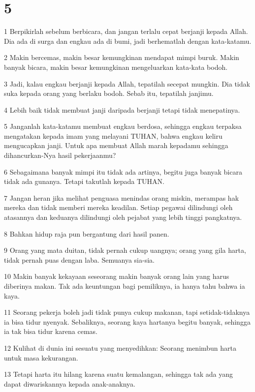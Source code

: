 \chapter{5}

\par 1 Berpikirlah sebelum berbicara, dan jangan terlalu cepat berjanji kepada Allah. Dia ada di surga dan engkau ada di bumi, jadi berhematlah dengan kata-katamu.
\par 2 Makin bercemas, makin besar kemungkinan mendapat mimpi buruk. Makin banyak bicara, makin besar kemungkinan mengeluarkan kata-kata bodoh.
\par 3 Jadi, kalau engkau berjanji kepada Allah, tepatilah secepat mungkin. Dia tidak suka kepada orang yang berlaku bodoh. Sebab itu, tepatilah janjimu.
\par 4 Lebih baik tidak membuat janji daripada berjanji tetapi tidak menepatinya.
\par 5 Janganlah kata-katamu membuat engkau berdosa, sehingga engkau terpaksa mengatakan kepada imam yang melayani TUHAN, bahwa engkau keliru mengucapkan janji. Untuk apa membuat Allah marah kepadamu sehingga dihancurkan-Nya hasil pekerjaanmu?
\par 6 Sebagaimana banyak mimpi itu tidak ada artinya, begitu juga banyak bicara tidak ada gunanya. Tetapi takutlah kepada TUHAN.
\par 7 Jangan heran jika melihat penguasa menindas orang miskin, merampas hak mereka dan tidak memberi mereka keadilan. Setiap pegawai dilindungi oleh atasannya dan keduanya dilindungi oleh pejabat yang lebih tinggi pangkatnya.
\par 8 Bahkan hidup raja pun bergantung dari hasil panen.
\par 9 Orang yang mata duitan, tidak pernah cukup uangnya; orang yang gila harta, tidak pernah puas dengan laba. Semuanya sia-sia.
\par 10 Makin banyak kekayaan seseorang makin banyak orang lain yang harus diberinya makan. Tak ada keuntungan bagi pemiliknya, ia hanya tahu bahwa ia kaya.
\par 11 Seorang pekerja boleh jadi tidak punya cukup makanan, tapi setidak-tidaknya ia bisa tidur nyenyak. Sebaliknya, seorang kaya hartanya begitu banyak, sehingga ia tak bisa tidur karena cemas.
\par 12 Kulihat di dunia ini sesuatu yang menyedihkan: Seorang menimbun harta untuk masa kekurangan.
\par 13 Tetapi harta itu hilang karena suatu kemalangan, sehingga tak ada yang dapat diwariskannya kepada anak-anaknya.
